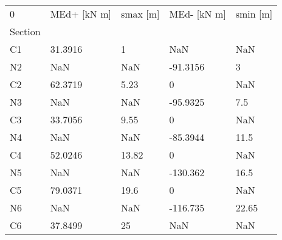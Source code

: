 \begin{tabular}{lllll}
\toprule
0 & MEd+ [kN m] & smax [m] & MEd- [kN m] & smin [m] \\
Section &             &          &             &          \\
\midrule
C1      &     31.3916 &        1 &         NaN &      NaN \\
N2      &         NaN &      NaN &    -91.3156 &        3 \\
C2      &     62.3719 &     5.23 &           0 &      NaN \\
N3      &         NaN &      NaN &    -95.9325 &      7.5 \\
C3      &     33.7056 &     9.55 &           0 &      NaN \\
N4      &         NaN &      NaN &    -85.3944 &     11.5 \\
C4      &     52.0246 &    13.82 &           0 &      NaN \\
N5      &         NaN &      NaN &    -130.362 &     16.5 \\
C5      &     79.0371 &     19.6 &           0 &      NaN \\
N6      &         NaN &      NaN &    -116.735 &    22.65 \\
C6      &     37.8499 &       25 &         NaN &      NaN \\
\bottomrule
\end{tabular}
